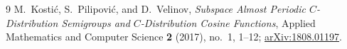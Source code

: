 \documentclass[11pt]{article}
\begin{document}
\begin{thebibliography}{9}
M.~Kosti\'c, S.~Pilipovi\'c, and D.~Velinov,
\emph{Subspace Almost Periodic $C$-Distribution Semigroups and
$C$-Distribution Cosine Functions},
Applied Mathematics and Computer Science \textbf{2} (2017), no.~1, 1--12;
\href{https://arxiv.org/abs/1808.01197}{arXiv:1808.01197}.
\end{thebibliography}
\end{document}
